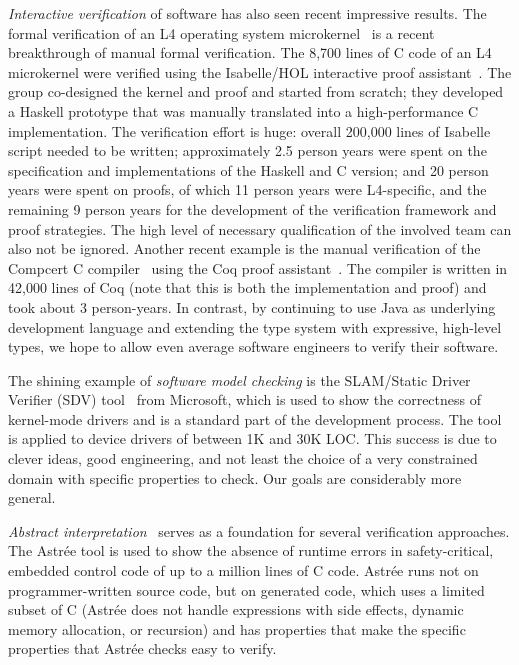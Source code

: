 \documentclass{sig-alternate}
\newcommand{\todo}[1]{{\color{red}\bfseries [[#1]]}}
\begin{document}
\emph{Interactive verification} of software has also seen recent impressive
results.
The formal verification of an L4 operating system
microkernel~\cite{Klein_EHACDEEKNSTW_10}
is a recent breakthrough of manual formal verification.
The 8,700 lines of C code of an L4 microkernel were verified using the
Isabelle/HOL interactive proof assistant~\cite{Isabelle2002}.
The group co-designed the kernel and proof and started from scratch;
they developed a Haskell prototype that was manually translated into a
high-performance C implementation.
The verification effort is huge:
overall 200,000 lines of Isabelle script needed to be written;
approximately 2.5 person years were spent on the specification and
implementations of the Haskell and C version; and
20 person years were spent on proofs, of which 11 person years were
L4-specific, and the remaining 9 person years for the development of the
verification framework and proof strategies. 
The high level of necessary qualification of the involved team can
also not be ignored.
Another recent example is the manual verification of the Compcert C
compiler~\cite{Leroy2009} using the Coq proof assistant~\cite{Coq2004}.
The compiler is written in 42,000 lines of Coq (note that this is both
the implementation and proof) and took about 3 person-years.
In contrast, by continuing to use Java as underlying development
language and extending the type system with expressive, high-level
types, we hope to allow even average software engineers to verify
their software.


The shining example of \emph{software model checking}
is the SLAM/Static Driver Verifier (SDV)
tool~\cite{BallMMR2001,BallBKL2010,BallLR2011} from Microsoft, which
is used to show the correctness of kernel-mode drivers and is a standard
part of the development process.
The tool is applied to device drivers of between 1K and 30K LOC\@.
This success is due to clever ideas, good engineering, and not least the
choice of a very constrained domain with specific properties to check.  Our
goals are considerably more general.

\newcommand\astree{Astr\'{e}e}

\emph{Abstract interpretation}~\cite{CousotCousot1977,Cousot2007}
serves as a foundation for several verification approaches.
The \astree{} tool is used to show the absence of runtime errors in
safety-critical, embedded control code of up to a million lines of C
code.
\astree{} runs not on
programmer-written source code, but on generated code, which uses a limited
subset of C (\astree{} does not handle expressions with side effects,
dynamic memory allocation, or recursion) and has properties
that make the specific properties that \astree{} checks easy to verify.
\end{document}
